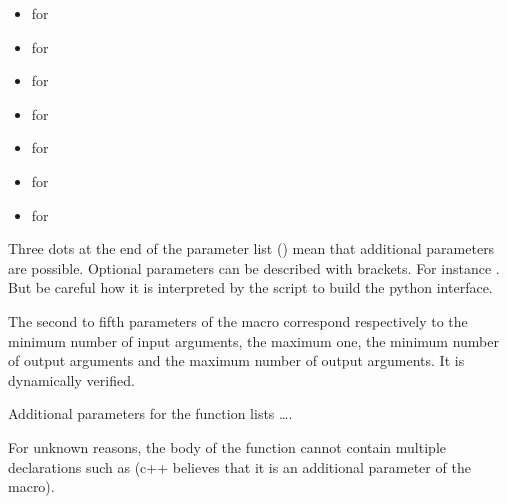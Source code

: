 \documentclass[a4paper,11pt,english]{sphinxmanual}
\begin{document}
\begin{itemize}
\begin{itemize}
\item {} 
  for  

\item {} 
  for  

\item {} 
  for  

\item {} 
  for  

\item {} 
  for  

\item {} 
  for  

\item {} 
  for  

\end{itemize}

Three dots at the end of the parameter list () mean that
additional parameters are possible. Optional parameters can be described
with brackets. For instance . But
be careful how it is interpreted by the  script
to build the python interface.

The second to fifth parameters of the macro correspond respectively to
the minimum number of input arguments, the maximum one, the minimum
number of output arguments and the maximum number of output arguments. It
is dynamically verified.

Additional parameters for the function lists ….

For unknown reasons, the body of the function cannot contain multiple
declarations such as  (c++ believes that it is an additional
parameter of the macro).

\end{itemize}
\end{document}
